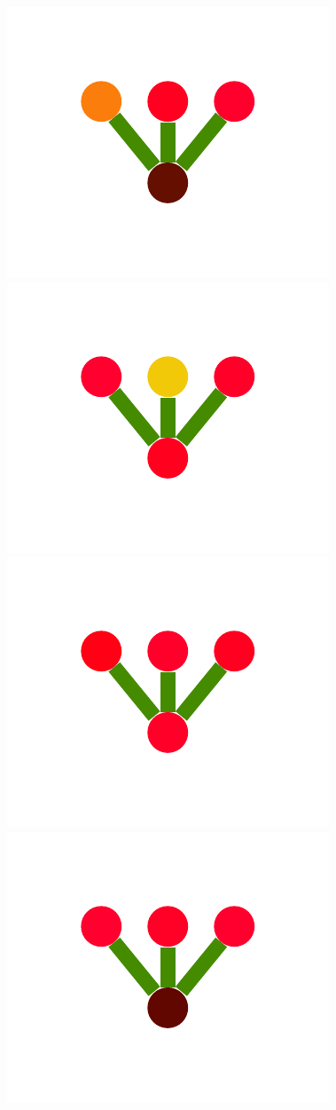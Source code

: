 \documentclass[a4paper,10pt]{article}
\begin{document}
\begin{figure}
{    \includegraphics[scale=.26]{./figures/4-2-2-mergeprog-good-1.pdf}
    \includegraphics[scale=.26]{./figures/4-2-2-mergeprog-good-2.pdf}
    \includegraphics[scale=.26]{./figures/4-2-2-mergeprog-good-3.pdf}
    \includegraphics[scale=.26]{./figures/4-2-2-mergeprog-good-4.pdf}
}
\end{figure}
\end{document}
